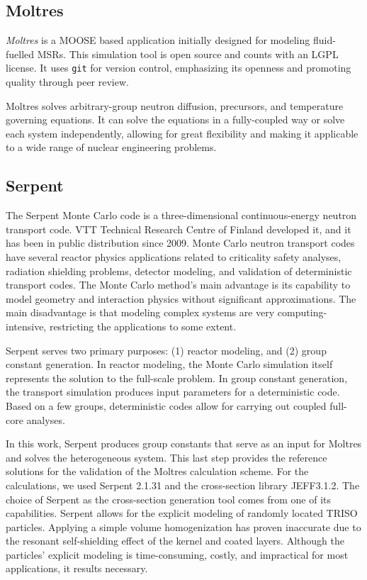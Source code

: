 \subsection{Moltres}

\textit{Moltres} \cite{lindsay_introduction_2018} is a \gls{MOOSE} based application initially designed for modeling fluid-fuelled \glspl{MSR}.
This simulation tool is open source and counts with an LGPL license.
It uses \texttt{git} for version control, emphasizing its openness and promoting quality through peer review.

Moltres solves arbitrary-group neutron diffusion, precursors, and temperature governing equations.
It can solve the equations in a fully-coupled way or solve each system independently, allowing for great flexibility and making it applicable to a wide range of nuclear engineering problems.

\subsection{Serpent}

The Serpent Monte Carlo code \cite{leppanen_development_2007} \cite{leppanen_calculation_2014} is a three-dimensional continuous-energy neutron transport code.
VTT Technical Research Centre of Finland developed it, and it has been in public distribution since 2009.
Monte Carlo neutron transport codes have several reactor physics applications related to criticality safety analyses, radiation shielding problems, detector modeling, and validation of deterministic transport codes.
The Monte Carlo method's main advantage is its capability to model geometry and interaction physics without significant approximations.
The main disadvantage is that modeling complex systems are very computing-intensive, restricting the applications to some extent.

Serpent serves two primary purposes: (1) reactor modeling, and (2) group constant generation.
In reactor modeling, the Monte Carlo simulation itself represents the solution to the full-scale problem.
In group constant generation, the transport simulation produces input parameters for a deterministic code.
Based on a few groups, deterministic codes allow for carrying out coupled full-core analyses.

In this work, Serpent produces group constants that serve as an input for Moltres and solves the heterogeneous system.
This last step provides the reference solutions for the validation of the Moltres calculation scheme.
For the calculations, we used Serpent 2.1.31 and the cross-section library JEFF3.1.2. 
The choice of Serpent as the cross-section generation tool comes from one of its capabilities.
Serpent allows for the explicit modeling of randomly located TRISO particles.
Applying a simple volume homogenization has proven inaccurate due to the resonant self-shielding effect of the kernel and coated layers.
Although the particles' explicit modeling is time-consuming, costly, and impractical for most applications, it results necessary.

